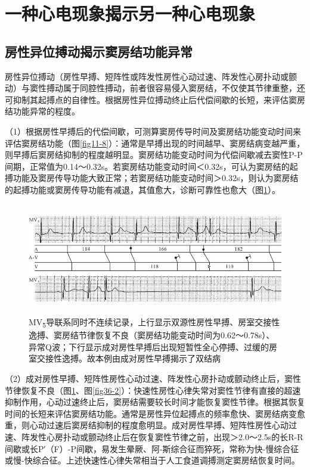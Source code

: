 \protect\hypertarget{text00043.htmlux5cux23subid465}{}{}

\section{一种心电现象揭示另一种心电现象}

\protect\hypertarget{text00043.htmlux5cux23subid466}{}{}

\subsection{房性异位搏动揭示窦房结功能异常}

房性异位搏动（房性早搏、短阵性或阵发性房性心动过速、阵发性心房扑动或颤动）与窦性搏动属于同腔性搏动，前者很容易侵入窦房结，不仅使其节律重整，还可抑制其起搏点的自律性。根据房性异位搏动终止后代偿间歇的长短，来评估窦房结功能异常的程度。

（1）根据房性早搏后的代偿间歇，可测算窦房传导时间及窦房结功能变动时间来评估窦房结功能（图\ref{fig11-8}）：通常是早搏出现的时间越早、窦房结病变越严重，则早搏后窦房结抑制的程度越明显。窦房结功能变动时间为代偿间歇减去窦性P-P间期，正常值为0.14～0.32s。若窦房结功能变动时间＜0.32s，可认为窦房结的起搏功能及窦房传导功能大致正常；若窦房结功能变动时间＞0.32s，则认为窦房结的起搏功能或窦房传导功能有减退，其值愈大，诊断可靠性也愈大（图\ref{fig36-1}）。

\begin{figure}[!htbp]
 \centering
 \includegraphics[width=5.71875in,height=1.91667in]{./images/Image00573.jpg}
 \captionsetup{justification=centering}
 \caption{MV\textsubscript{5}导联系同时不连续记录，上行显示双源性房性早搏、房室交接性逸搏、窦房结节律恢复不良（窦房结功能变动时间为0.62～0.78s）、异常Q波；下行显示成对房性早搏后出现短暂性全心停搏、过缓的房室交接性逸搏。故本例由成对房性早搏揭示了双结病}
 \label{fig36-1}
  \end{figure} 


（2）成对房性早搏、短阵性房性心动过速、阵发性心房扑动或颤动终止后，窦性节律恢复不良（图\ref{fig36-1}、图\ref{fig36-2}）：快速性房性心律失常对窦性节律有直接的超速抑制作用，心动过速终止后，窦房结需要较长时间才能恢复窦性节律。根据其恢复时间的长短来评估窦房结功能。通常是房性异位起搏点的频率愈快、窦房结病变愈重，则心动过速后窦房结抑制的程度愈明显。成对房性早搏、短阵性房性心动过速、阵发性心房扑动或颤动终止后在恢复窦性节律之前，出现＞2.0～2.5s的长R-R间歇或长P′（F）-P间歇，易发生晕厥、阿-斯综合征而猝死，常称为快-慢综合征或慢-快综合征。上述快速性心律失常相当于人工食道调搏测定窦房结恢复时间。

